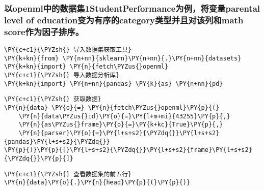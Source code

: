     \hypertarget{ux4ee5openmlux4e2dux7684ux6570ux636eux96c61studentperformanceux4e3aux4f8bux5c06ux53d8ux91cfparental-level-of-educationux53d8ux4e3aux6709ux5e8fux7684categoryux7c7bux578bux5e76ux4e14ux5bf9ux8be5ux5217ux548cmath-scoreux4f5cux4e3aux56e0ux5b50ux6392ux5e8f}{%
\subsubsection{以openml中的数据集1StudentPerformance为例，将变量parental
level of education变为有序的category类型并且对该列和math
score作为因子排序。}\label{ux4ee5openmlux4e2dux7684ux6570ux636eux96c61studentperformanceux4e3aux4f8bux5c06ux53d8ux91cfparental-level-of-educationux53d8ux4e3aux6709ux5e8fux7684categoryux7c7bux578bux5e76ux4e14ux5bf9ux8be5ux5217ux548cmath-scoreux4f5cux4e3aux56e0ux5b50ux6392ux5e8f}}

    \begin{tcolorbox}[breakable, size=fbox, boxrule=1pt, pad at break*=1mm,colback=cellbackground, colframe=cellborder]
\begin{Verbatim}[commandchars=\\\{\}]
\PY{c+c1}{\PYZsh{} 导入数据集获取工具}
\PY{k+kn}{from} \PY{n+nn}{sklearn}\PY{n+nn}{.}\PY{n+nn}{datasets} \PY{k+kn}{import} \PY{n}{fetch\PYZus{}openml}
\PY{c+c1}{\PYZsh{} 导入数据分析库}
\PY{k+kn}{import} \PY{n+nn}{pandas} \PY{k}{as} \PY{n+nn}{pd}
\end{Verbatim}
\end{tcolorbox}

    \begin{tcolorbox}[breakable, size=fbox, boxrule=1pt, pad at break*=1mm,colback=cellbackground, colframe=cellborder]
\begin{Verbatim}[commandchars=\\\{\}]
\PY{c+c1}{\PYZsh{} 获取数据}
\PY{n}{data} \PY{o}{=} \PY{n}{fetch\PYZus{}openml}\PY{p}{(}
    \PY{n}{data\PYZus{}id}\PY{o}{=}\PY{l+m+mi}{43255}\PY{p}{,}
    \PY{n}{as\PYZus{}frame}\PY{o}{=}\PY{k+kc}{True}\PY{p}{,}
    \PY{n}{parser}\PY{o}{=}\PY{l+s+s2}{\PYZdq{}}\PY{l+s+s2}{pandas}\PY{l+s+s2}{\PYZdq{}}
\PY{p}{)}\PY{p}{[}\PY{l+s+s2}{\PYZdq{}}\PY{l+s+s2}{frame}\PY{l+s+s2}{\PYZdq{}}\PY{p}{]}
\end{Verbatim}
\end{tcolorbox}

    \begin{tcolorbox}[breakable, size=fbox, boxrule=1pt, pad at break*=1mm,colback=cellbackground, colframe=cellborder]
\begin{Verbatim}[commandchars=\\\{\}]
\PY{c+c1}{\PYZsh{} 查看数据集的前五行}
\PY{n}{data}\PY{o}{.}\PY{n}{head}\PY{p}{(}\PY{p}{)}
\end{Verbatim}
\end{tcolorbox}

